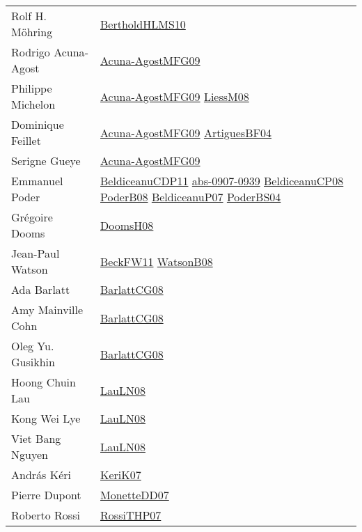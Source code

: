{\begin{longtable}{p{4cm}p{15cm}}
Rolf H. M{\"{o}}hring & \href{papers/BertholdHLMS10.pdf}{BertholdHLMS10}\cite{BertholdHLMS10} \\
Rodrigo Acuna{-}Agost & \href{papers/Acuna-AgostMFG09.pdf}{Acuna-AgostMFG09}\cite{Acuna-AgostMFG09} \\
Philippe Michelon & \href{papers/Acuna-AgostMFG09.pdf}{Acuna-AgostMFG09}\cite{Acuna-AgostMFG09} \href{articles/LiessM08.pdf}{LiessM08}\cite{LiessM08} \\
Dominique Feillet & \href{papers/Acuna-AgostMFG09.pdf}{Acuna-AgostMFG09}\cite{Acuna-AgostMFG09} \href{papers/ArtiguesBF04.pdf}{ArtiguesBF04}\cite{ArtiguesBF04} \\
Serigne Gueye & \href{papers/Acuna-AgostMFG09.pdf}{Acuna-AgostMFG09}\cite{Acuna-AgostMFG09} \\
Emmanuel Poder & \href{articles/BeldiceanuCDP11.pdf}{BeldiceanuCDP11}\cite{BeldiceanuCDP11} \href{articles/abs-0907-0939.pdf}{abs-0907-0939}\cite{abs-0907-0939} \href{papers/BeldiceanuCP08.pdf}{BeldiceanuCP08}\cite{BeldiceanuCP08} \href{papers/PoderB08.pdf}{PoderB08}\cite{PoderB08} \href{papers/BeldiceanuP07.pdf}{BeldiceanuP07}\cite{BeldiceanuP07} \href{articles/PoderBS04.pdf}{PoderBS04}\cite{PoderBS04} \\
Gr{\'{e}}goire Dooms & \href{papers/DoomsH08.pdf}{DoomsH08}\cite{DoomsH08} \\
Jean{-}Paul Watson & \href{articles/BeckFW11.pdf}{BeckFW11}\cite{BeckFW11} \href{papers/WatsonB08.pdf}{WatsonB08}\cite{WatsonB08} \\
Ada Barlatt & \href{papers/BarlattCG08.pdf}{BarlattCG08}\cite{BarlattCG08} \\
Amy Mainville Cohn & \href{papers/BarlattCG08.pdf}{BarlattCG08}\cite{BarlattCG08} \\
Oleg Yu. Gusikhin & \href{papers/BarlattCG08.pdf}{BarlattCG08}\cite{BarlattCG08} \\
Hoong Chuin Lau & \href{papers/LauLN08.pdf}{LauLN08}\cite{LauLN08} \\
Kong Wei Lye & \href{papers/LauLN08.pdf}{LauLN08}\cite{LauLN08} \\
Viet Bang Nguyen & \href{papers/LauLN08.pdf}{LauLN08}\cite{LauLN08} \\
Andr{\'{a}}s K{\'{e}}ri & \href{papers/KeriK07.pdf}{KeriK07}\cite{KeriK07} \\
Pierre Dupont & \href{papers/MonetteDD07.pdf}{MonetteDD07}\cite{MonetteDD07} \\
Roberto Rossi & \href{papers/RossiTHP07.pdf}{RossiTHP07}\cite{RossiTHP07} \\

\end{longtable}}
